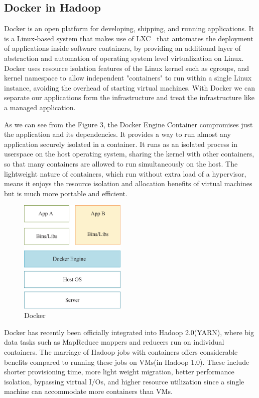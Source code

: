 \subsection{Docker in Hadoop}
Docker is an open platform for developing, shipping, and running applications. It is a Linux-based system that makes use of LXC~\cite{helsley2009lxc} that automates the deployment of applications inside software containers, by providing an additional layer of abstraction and automation of operating system level virtualization on Linux. Docker uses resource isolation features of the Linux kernel such as cgroups, and kernel namespace to allow independent "containers" to run within a single Linux instance, avoiding the overhead of starting virtual machines. With Docker we can separate our applications form the infrastructure and treat the infrastructure like a managed application. 

As we can see from the Figure 3, the Docker Engine Container compromises just the application and its dependencies. It provides a way to run almost any application securely isolated in a container. It runs as an isolated process in userspace on the host operating system, sharing the kernel with other containers, so that many containers are allowed to run simultaneously on the host. The lightweight nature of containers, which run without extra load of a hypervisor, means it enjoys the resource isolation and allocation benefits of virtual machines but is much more portable and efficient.

\begin{figure}[t]
  \centering
  \includegraphics[width=2in]{figs/docker.eps}
  \caption{Docker}
  \label{fig:Dockeroverview}
\end{figure}

Docker has recently been officially integrated into Hadoop 2.0(YARN), where big data tasks such as MapReduce mappers and reducers run on individual containers. The marriage of Hadoop jobs with containers offers considerable benefits compared to running these jobs on VMs(in Hadoop 1.0). These include shorter provisioning time, more light weight migration, better performance isolation, bypassing virtual I/Os, and higher resource utilization since a single machine can accommodate more containers than VMs. 

